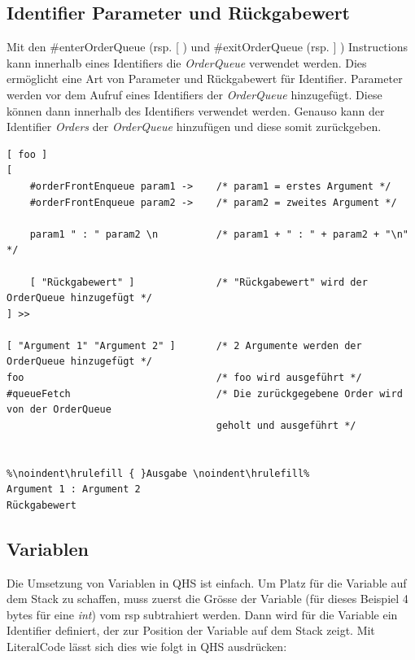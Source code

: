 \subsection{Identifier Parameter und Rückgabewert}
Mit den \#enterOrderQueue (rsp. [ ) und \#exitOrderQueue (rsp. ] ) Instructions kann innerhalb eines Identifiers die \textit{OrderQueue} verwendet werden. Dies ermöglicht eine Art von Parameter und Rückgabewert für Identifier.
Parameter werden vor dem Aufruf eines Identifiers der \textit{OrderQueue} hinzugefügt. Diese können dann innerhalb des Identifiers verwendet werden.
Genauso kann der Identifier \textit{Orders} der \textit{OrderQueue} hinzufügen und diese somit zurückgeben.

\begin{lstlisting}[language=QHS, caption=Verwendung von Parametern und Rückgabewert eines Identifiers]
%\noindent\hrulefill { }Eingabe \noindent\hrulefill%
[ foo ]
[
    #orderFrontEnqueue param1 ->    /* param1 = erstes Argument */
    #orderFrontEnqueue param2 ->    /* param2 = zweites Argument */

    param1 " : " param2 \n          /* param1 + " : " + param2 + "\n" */

    [ "Rückgabewert" ]              /* "Rückgabewert" wird der OrderQueue hinzugefügt */
] >>

[ "Argument 1" "Argument 2" ]       /* 2 Argumente werden der OrderQueue hinzugefügt */
foo                                 /* foo wird ausgeführt */
#queueFetch                         /* Die zurückgegebene Order wird von der OrderQueue
                                    geholt und ausgeführt */


%\noindent\hrulefill { }Ausgabe \noindent\hrulefill%
Argument 1 : Argument 2
Rückgabewert
\end{lstlisting}


\subsection{Variablen} \label{sec:qhs-vars}
Die Umsetzung von Variablen in QHS ist einfach.
Um Platz für die Variable auf dem Stack zu schaffen, muss zuerst die Grösse der Variable (für dieses Beispiel 4 bytes für eine \textit{int}) vom rsp subtrahiert werden.
Dann wird für die Variable ein Identifier definiert, der zur Position der Variable auf dem Stack zeigt.
Mit LiteralCode lässt sich dies wie folgt in QHS ausdrücken:

